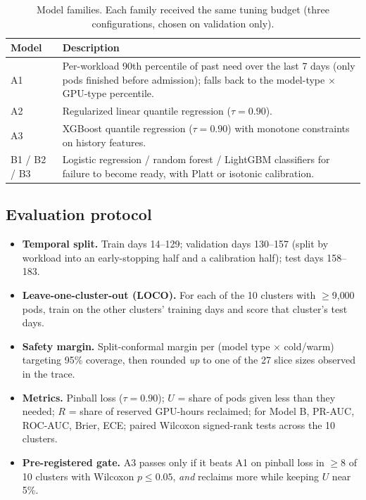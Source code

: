 \documentclass[11pt]{article}
\begin{document}
\begin{table}[h]
\centering\small
\caption{Model families. Each family received the same tuning budget (three configurations, chosen on validation only).}
\label{tab:models}
\begin{tabularx}{\linewidth}{@{}lL@{}}
\toprule
Model & Description \\
\midrule
A1 & Per-workload 90th percentile of past need over the last 7 days (only pods finished before admission); falls back to the model-type $\times$ GPU-type percentile. \\
A2 & Regularized linear quantile regression ($\tau = 0.90$). \\
A3 & XGBoost quantile regression ($\tau = 0.90$) with monotone constraints on history features. \\
B1 / B2 / B3 & Logistic regression / random forest / LightGBM classifiers for failure to become ready, with Platt or isotonic calibration. \\
\bottomrule
\end{tabularx}
\end{table}

\subsection{Evaluation protocol}
\begin{itemize}
  \item \textbf{Temporal split.} Train days 14--129; validation days 130--157 (split by workload into an early-stopping half and a calibration half); test days 158--183.
  \item \textbf{Leave-one-cluster-out (LOCO).} For each of the 10 clusters with $\ge$9{,}000 pods, train on the other clusters' training days and score that cluster's test days.
  \item \textbf{Safety margin.} Split-conformal margin per (model type $\times$ cold/warm) targeting 95\% coverage, then rounded \emph{up} to one of the 27 slice sizes observed in the trace.
  \item \textbf{Metrics.} Pinball loss ($\tau=0.90$); $U$ = share of pods given less than they needed; $R$ = share of reserved GPU-hours reclaimed; for Model B, PR-AUC, ROC-AUC, Brier, ECE; paired Wilcoxon signed-rank tests across the 10 clusters.
  \item \textbf{Pre-registered gate.} A3 passes only if it beats A1 on pinball loss in $\ge$8 of 10 clusters with Wilcoxon $p \le 0.05$, \emph{and} reclaims more while keeping $U$ near 5\%.
\end{itemize}
\end{document}
